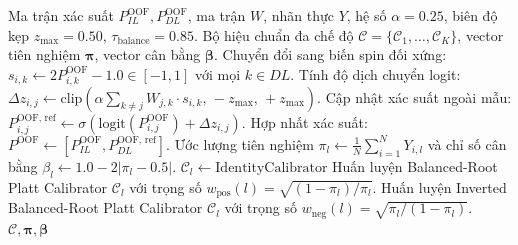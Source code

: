 \documentclass[10pt,a4paper,twoside]{article}
\begin{document}
\begin{algorithm}[H]
\caption{Giai Đoạn 2: Chuẩn Hóa Trường Trung Bình (OS-NMF) \& Hiệu Chuẩn Ba Chế Độ}
\label{alg:osnmf}
\begin{algorithmic}[1]
\Require Ma trận xác suất $P^{\text{OOF}}_{IL}, P^{\text{OOF}}_{DL}$, ma trận $W$, nhãn thực $Y$, hệ số $\alpha=0.25$, biên độ kẹp $z_{\max}=0.50$, $\tau_{\text{balance}}=0.85$.
\Ensure Bộ hiệu chuẩn đa chế độ $\mathcal{C} = \{\mathcal{C}_1, \dots, \mathcal{C}_K\}$, vector tiên nghiệm $\boldsymbol{\pi}$, vector cân bằng $\boldsymbol{\beta}$.
    \State Chuyển đổi sang biến spin đối xứng: $s_{i, k} \gets 2 P^{\text{OOF}}_{i, k} - 1.0 \in [-1, 1]$ với mọi $k \in DL$.
    \State Tính độ dịch chuyển logit: $\Delta z_{i, j} \gets \text{clip}\left(\alpha \sum_{k \neq j} W_{j, k} \cdot s_{i, k}, \, -z_{\max}, \, +z_{\max}\right)$.
    \State Cập nhật xác suất ngoài mẫu: $P^{\text{OOF, ref}}_{i, j} \gets \sigma\left(\text{logit}(P^{\text{OOF}}_{i, j}) + \Delta z_{i, j}\right)$.
\EndFor
\State Hợp nhất xác suất: $P^{\text{OOF}} \gets [P^{\text{OOF}}_{IL}, P^{\text{OOF, ref}}_{DL}]$.
    \State Ước lượng tiên nghiệm $\pi_l \gets \frac{1}{N}\sum_{i=1}^N Y_{i, l}$ và chỉ số cân bằng $\beta_l \gets 1.0 - 2|\pi_l - 0.5|$.
     
        \State $\mathcal{C}_l \gets \text{IdentityCalibrator}$ 
     
        \State Huấn luyện Balanced-Root Platt Calibrator $\mathcal{C}_l$ với trọng số $w_{\text{pos}}(l) = \sqrt{(1 - \pi_l) / \pi_l}$.
    \Else {}
        \State Huấn luyện Inverted Balanced-Root Platt Calibrator $\mathcal{C}_l$ với trọng số $w_{\text{neg}}(l) = \sqrt{\pi_l / (1 - \pi_l)}$.
    \EndIf
\EndFor
\State \Return $\mathcal{C}, \boldsymbol{\pi}, \boldsymbol{\beta}$
\end{algorithmic}
\end{algorithm}
\end{document}
